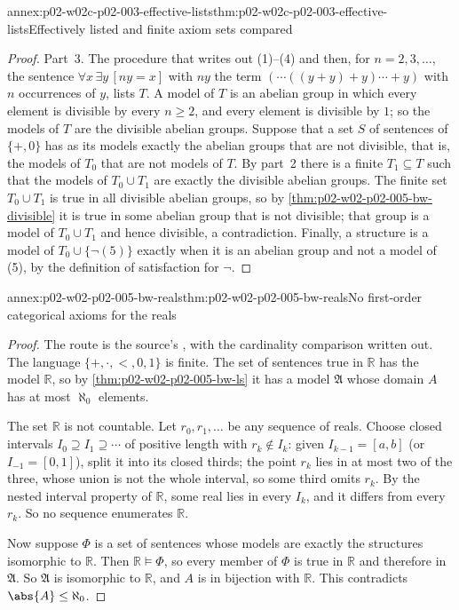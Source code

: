 \begin{annexitem}{annex:p02-w02c-p02-003-effective-lists}{thm:p02-w02c-p02-003-effective-lists}{Effectively listed and finite axiom sets compared}
\begin{proof}
Part~3.  The procedure that writes out (1)--(4) and then, for
\(n=2,3,\ldots\), the sentence \(\forall x\,\exists y\,[ny=x]\) with
\(ny\) the term \((\cdots((y+y)+y)\cdots+y)\) with \(n\) occurrences of
\(y\), lists \(T\).  A model of \(T\) is an abelian group in which every
element is divisible by every \(n\geq2\), and every element is divisible
by \(1\); so the models of \(T\) are the divisible abelian groups.
Suppose that a set \(S\) of sentences of \(\{+,0\}\) has as its models
exactly the abelian groups that are not divisible, that is, the models of
\(T_0\) that are not models of \(T\).  By part~2 there is a finite
\(T_1\subseteq T\) such that the models of \(T_0\cup T_1\) are exactly the
divisible abelian groups.  The finite set \(T_0\cup T_1\) is true in all
divisible abelian groups, so by
\cref{thm:p02-w02-p02-005-bw-divisible} it is true in some abelian group
that is not divisible; that group is a model of \(T_0\cup T_1\) and hence
divisible, a contradiction.  Finally, a structure is a model of
\(T_0\cup\{\neg(5)\}\) exactly when it is an abelian group and not a model
of (5), by the definition of satisfaction for \(\neg\).
\end{proof}
\end{annexitem}

\begin{annexitem}{annex:p02-w02-p02-005-bw-reals}{thm:p02-w02-p02-005-bw-reals}{No first-order categorical axioms for the reals}
\begin{proof}
The route is the source's \cite[ch.~A.1, \S2, p.~12]{Barwise1977FirstOrder},
with the cardinality comparison written out.  The language
\(\{+,\cdot,<,0,1\}\) is finite.  The set of sentences true in
\(\mathbb R\) has the model \(\mathbb R\), so by
\cref{thm:p02-w02-p02-005-bw-ls} it has a model \(\mathfrak A\) whose
domain \(A\) has at most \(\aleph_0\) elements.

The set \(\mathbb R\) is not countable.  Let \(r_0,r_1,\ldots\) be any
sequence of reals.  Choose closed intervals
\(I_0\supseteq I_1\supseteq\cdots\) of positive length with
\(r_k\notin I_k\): given \(I_{k-1}=[a,b]\) (or \(I_{-1}=[0,1]\)), split it
into its closed thirds; the point \(r_k\) lies in at most two of the
three, whose union is not the whole interval, so some third omits
\(r_k\).  By the nested interval property of \(\mathbb R\), some real lies
in every \(I_k\), and it differs from every \(r_k\).  So no sequence
enumerates \(\mathbb R\).

Now suppose \(\Phi\) is a set of sentences whose models are exactly the
structures isomorphic to \(\mathbb R\).  Then \(\mathbb R\models\Phi\), so
every member of \(\Phi\) is true in \(\mathbb R\) and therefore in
\(\mathfrak A\).  So \(\mathfrak A\) is isomorphic to \(\mathbb R\), and
\(A\) is in bijection with \(\mathbb R\).  This contradicts
\(\abs{A}\leq\aleph_0\).
\end{proof}
\end{annexitem}

